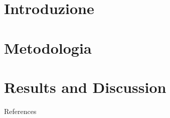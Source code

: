 \documentclass[compress]{beamer}
\begin{document}
\begin{frame}[plain]
    \titlepage
\end{frame}

\section{Introduzione}


\section{Metodologia}


\section{Results and Discussion}





\begin{frame}{References}

\end{frame}
\end{document}
